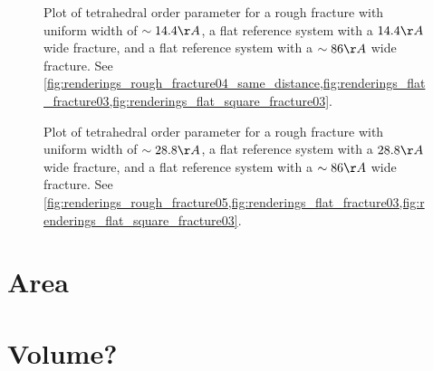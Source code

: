 \begin{figure}[!p]%
    \centering%
    {
        \captionsetup{width=\textwidth} 
        \caption{%
            Plot of tetrahedral order parameter for a rough fracture with uniform width of $\sim 14.4\AA$, a flat reference system with a $14.4\AA$ wide fracture, and a flat reference system with a $\sim 86 \AA$ wide fracture. See \cref{fig:renderings_rough_fracture04_same_distance,fig:renderings_flat_fracture03,fig:renderings_flat_square_fracture03}.%
        }%
    }
\end{figure}%
%
\begin{figure}[!p]%
    \centering%
    {
        \captionsetup{width=\textwidth} 
        \caption{%
            Plot of tetrahedral order parameter for a rough fracture with uniform width of $\sim 28.8\AA$, a flat reference system with a $28.8\AA$ wide fracture, and a flat reference system with a $\sim 86 \AA$ wide fracture. See \cref{fig:renderings_rough_fracture05,fig:renderings_flat_fracture03,fig:renderings_flat_square_fracture03}.%
        }%
    }
\end{figure}%
%
%
\FloatBarrier
\section{Area}
\section{Volume?}

